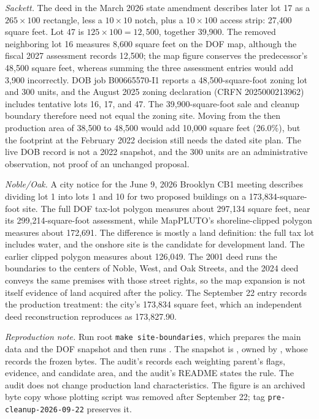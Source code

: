 \textit{Sackett.} The deed in the March 2026 state amendment describes later
lot 17 as a $265\times100$ rectangle, less a $10\times10$ notch, plus a
$10\times100$ access strip: 27,400 square feet. Lot 47 is $125\times100 =
12,500$, together 39,900. The removed neighboring lot 16 measures 8,600 square
feet on the DOF map, although the fiscal 2027 assessment records 12,500; the
map figure conserves the predecessor's 48,500 square feet, whereas summing the
three assessment entries would add 3,900 incorrectly. DOB job B00665570-I1
reports a 48,500-square-foot zoning lot and 300 units, and the August 2025
zoning declaration (CRFN 2025000213962) includes tentative lots 16, 17, and 47.
The 39,900-square-foot sale and cleanup boundary therefore need not equal the
zoning site. Moving from the then production area of 38,500 to 48,500 would
add 10,000 square feet (26.0\%), but the footprint at the February 2022
decision still needs the dated site plan. The live DOB record is not a 2022
snapshot, and the 300 units are an administrative observation, not proof of an
unchanged proposal.

\textit{Noble/Oak.} A city notice for the June 9, 2026 Brooklyn CB1 meeting
describes dividing lot 1 into lots 1 and 10 for two proposed buildings on a
173,834-square-foot site. The full DOF tax-lot polygon measures about 297,134
square feet, near its 299,214-square-foot assessment, while MapPLUTO's
shoreline-clipped polygon measures about 172,691. The difference is mostly a
land definition: the full tax lot includes water, and the onshore site is the
candidate for development land. The earlier clipped polygon measures about
126,049. The 2001 deed runs the boundaries to the centers of Noble, West, and
Oak Streets, and the 2024 deed conveys the same premises with those street
rights, so the map expansion is not itself evidence of land acquired after the
policy. The September 22 entry records the production treatment: the city's
173,834 square feet, which an independent deed reconstruction reproduces as
173,827.90.

\textit{Reproduction note.} Run root \texttt{make site-boundaries}, which
prepares the main data and the DOF snapshot and then runs
. The snapshot is
, owned by
, whose 
records the frozen bytes. The audit's 
records each weighting parent's flags, evidence, and candidate area, and the
audit's README states the rule. The audit does not
change production land characteristics. The figure is an archived byte copy
whose plotting script was removed after September 22; tag
\texttt{pre-cleanup-2026-09-22} preserves it.
